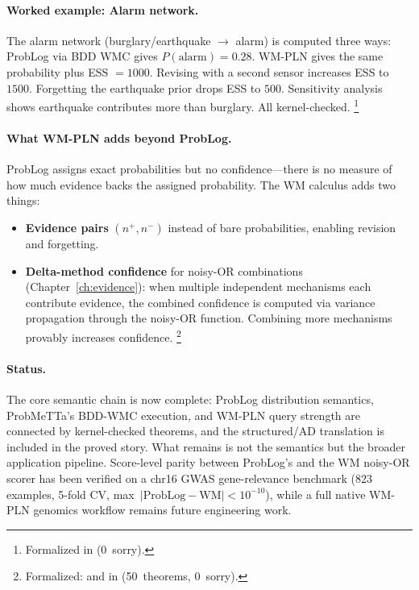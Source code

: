 \documentclass[11pt,openany]{report}
\begin{document}
\paragraph{Worked example: Alarm network.}
The alarm network (burglary/earthquake $\to$ alarm) is computed
three ways: ProbLog via BDD WMC gives $P(\mathrm{alarm}) = 0.28$.
WM-PLN gives the same probability plus ESS $= 1000$.  Revising
with a second sensor increases ESS to $1500$.  Forgetting the
earthquake prior drops ESS to $500$.  Sensitivity analysis shows
earthquake contributes more than burglary.  All kernel-checked.%
\footnote{Formalized in
(0~sorry).}

\paragraph{What WM-PLN adds beyond ProbLog.}
ProbLog assigns exact probabilities but no confidence---there is
no measure of how much evidence backs the assigned probability.
The WM calculus adds two things:
\begin{itemize}
\item \textbf{Evidence pairs} $(n^+, n^-)$ instead of bare
  probabilities, enabling revision and forgetting.
\item \textbf{Delta-method confidence} for noisy-OR combinations
  (Chapter~\ref{ch:evidence}): when multiple independent
  mechanisms each contribute evidence, the combined confidence is
  computed via variance propagation through the noisy-OR function.
  Combining more mechanisms provably increases confidence.%
  \footnote{Formalized:
   and
   in
  (50~theorems, 0~sorry).}
\end{itemize}

\paragraph{Status.}
The core semantic chain is now complete: ProbLog distribution semantics,
ProbMeTTa's BDD-WMC execution, and WM-PLN query strength are connected by
kernel-checked theorems, and the structured/AD translation is included
in the proved story.  What remains is not the semantics but the broader
application pipeline.  Score-level parity between ProbLog's
 and the WM noisy-OR scorer has been verified on a chr16
GWAS gene-relevance benchmark (823 examples, 5-fold CV,
max~$|\mathrm{ProbLog} - \mathrm{WM}| < 10^{-10}$), while a full native
WM-PLN genomics workflow remains future engineering work.
\end{document}
